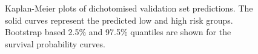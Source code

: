 \documentclass[letterpaper,12pt]{article}
\begin{document}
\begin{figure}[!th]
{\label{fig:KM2subfig1}
}
\caption{Kaplan-Meier plots of dichotomised validation set predictions. The solid curves represent the predicted low and high risk groups. Bootstrap based 2.5\% and 97.5\% quantiles are shown for the survival probability curves.}
\label{Fig:PLSCoxKaplanMeier}
\end{figure}
\end{document}
